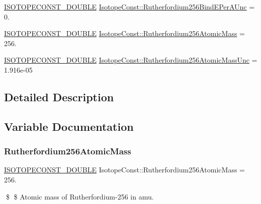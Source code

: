 \begin{DoxyCompactItemize}
\item 
\mbox{\hyperlink{group___isotope_const-_macros_ga8f45a7272ce02c0b4c65c44636ed719a}{I\+S\+O\+T\+O\+P\+E\+C\+O\+N\+S\+T\+\_\+\+D\+O\+U\+B\+LE}} \mbox{\hyperlink{group___isotope_const-_rutherfordium-_rf256_ga60582dbf0ae1aeb54f9e456cfc24fd0e}{Isotope\+Const\+::\+Rutherfordium256\+Bind\+E\+Per\+A\+Unc}} = 0.
\item 
\mbox{\hyperlink{group___isotope_const-_macros_ga8f45a7272ce02c0b4c65c44636ed719a}{I\+S\+O\+T\+O\+P\+E\+C\+O\+N\+S\+T\+\_\+\+D\+O\+U\+B\+LE}} \mbox{\hyperlink{group___isotope_const-_rutherfordium-_rf256_ga3ace1223f0eee1bb4a5620d05d102301}{Isotope\+Const\+::\+Rutherfordium256\+Atomic\+Mass}} = 256.
\item 
\mbox{\hyperlink{group___isotope_const-_macros_ga8f45a7272ce02c0b4c65c44636ed719a}{I\+S\+O\+T\+O\+P\+E\+C\+O\+N\+S\+T\+\_\+\+D\+O\+U\+B\+LE}} \mbox{\hyperlink{group___isotope_const-_rutherfordium-_rf256_ga8d66e71436c9022789382572c65ec486}{Isotope\+Const\+::\+Rutherfordium256\+Atomic\+Mass\+Unc}} = 1.\+916e-\/05
\end{DoxyCompactItemize}


\subsection{Detailed Description}


\subsection{Variable Documentation}
\mbox{\label{group___isotope_const-_rutherfordium-_rf256_ga3ace1223f0eee1bb4a5620d05d102301}} 
\subsubsection{\texorpdfstring{Rutherfordium256\+Atomic\+Mass}{Rutherfordium256AtomicMass}}
{\footnotesize\ttfamily \mbox{\hyperlink{group___isotope_const-_macros_ga8f45a7272ce02c0b4c65c44636ed719a}{I\+S\+O\+T\+O\+P\+E\+C\+O\+N\+S\+T\+\_\+\+D\+O\+U\+B\+LE}} Isotope\+Const\+::\+Rutherfordium256\+Atomic\+Mass = 256.}

\$ \$ Atomic mass of Rutherfordium-\/256 in amu. \mbox{\label{group___isotope_const-_rutherfordium-_rf256_ga8d66e71436c9022789382572c65ec486}} 

